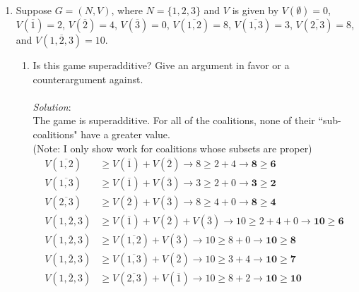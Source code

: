 \documentclass{article}
\begin{document}
\begin{enumerate}
%
\hfill\newline
\item Suppose $G = (N, V)$, where $N = \{ 1, 2, 3 \}$ and $V$ is given by $V(\emptyset) = 0$, $V(\overline{1}) = 2$, $V(\overline{2}) = 4$, $V(\overline{3}) = 0$, $V(\overline{1, 2}) = 8$, $V(\overline{1, 3}) = 3$, $V(\overline{2, 3}) = 8$, and $V(\overline{1, 2, 3}) = 10$.
    \begin{enumerate}
    \item Is this game superadditive? Give an argument in favor or a counterargument against. \\\\
    \textit{Solution}:\\
    The game is superadditive. For all of the coalitions, none of their ``sub-coalitions" have a greater value.\\
    (Note: I only show work for coalitions whose subsets are proper)
    \begin{align*}
    V(\overline{1, 2}) &\ge V(\overline{1}) + V(\overline{2})                       \rightarrow  8 \ge 2 + 4       \rightarrow  \mathbf{8 \ge 6}   \\
    V(\overline{1, 3}) &\ge V(\overline{1}) + V(\overline{3})                       \rightarrow  3 \ge 2 + 0       \rightarrow  \mathbf{3 \ge 2}   \\
    V(\overline{2, 3}) &\ge V(\overline{2}) + V(\overline{3})                       \rightarrow  8 \ge 4 + 0       \rightarrow  \mathbf{8 \ge 4}   \\
    V(\overline{1, 2, 3}) &\ge V(\overline{1}) + V(\overline{2}) + V(\overline{3})  \rightarrow  10 \ge 2 + 4 + 0  \rightarrow  \mathbf{10 \ge 6}  \\
    V(\overline{1, 2, 3}) &\ge V(\overline{1, 2}) + V(\overline{3})                 \rightarrow  10 \ge 8 + 0      \rightarrow  \mathbf{10 \ge 8}  \\
    V(\overline{1, 2, 3}) &\ge V(\overline{1, 3}) + V(\overline{2})                 \rightarrow  10 \ge 3 + 4      \rightarrow  \mathbf{10 \ge 7}  \\
    V(\overline{1, 2, 3}) &\ge V(\overline{2, 3}) + V(\overline{1})                 \rightarrow  10 \ge 8 + 2      \rightarrow  \mathbf{10 \ge 10} \\
    \end{align*}


\end{enumerate}
\end{enumerate}
\end{document}
